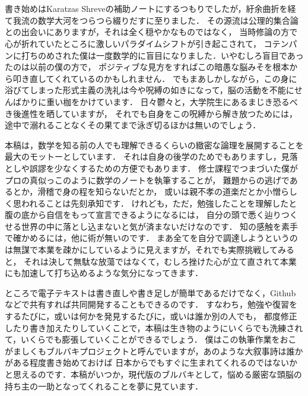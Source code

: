 \chapter*{}
書き始めはKaratzas Shreveの補助ノートにするつもりでしたが，紆余曲折を経て我流の数学大河をつらつら綴りだすに至りました．
その源流は公理的集合論との出会いにありますが，それは全く穏やかなものではなく，
当時修論の方で心が折れていたところに激しいパラダイムシフトが引き起こされて，
コテンパンに打ちのめされた僕は一度数学的に盲目になりました．いやむしろ盲目であったのは以前の僕の方で，
ポジティブな見方をすればこの暗愚な脳みそを根本から叩き直してくれているのかもしれません．
でもまあしかしながら，この身に浴びてしまった形式主義の洗礼は今や呪縛の如きになって，脳の活動を不能にせんばかりに重い枷をかけています．
日々鬱々と，大学院生にあるまじき恐るべき後進性を晒していますが，
それでも自身をこの呪縛から解き放つためには，途中で溺れることなくその果てまで泳ぎ切るほかは無いのでしょう．

本稿は，数学を知る前の人でも理解できるくらいの緻密な論理を展開することを最大のモットーとしています．
それは自身の後学のためでもありますし，見落としや誤謬を少なくするための方便でもあります．
修士課程でつまづいた僕がプロの真似っこのように数学のノートを執筆することが，
難題からの逃げであるとか，滑稽で身の程を知らないだとか，
或いは親不孝の道楽だとか小憎らしく思われることは先刻承知です．
けれども，ただ，勉強したことを理解したと腹の底から自信をもって宣言できるようになるには，
自分の頭で悉く辿りつくせる世界の中に落とし込まないと気が済まないだけなのです．
知の感触を素手で確かめるには，他に術が無いのです．
まあ全てを自分で調達しようというのは無謀で本業を疎かにしているように見えますが，それでも実際挑戦してみると，
それは決して無駄な放蕩ではなくて，むしろ挫けた心が立て直されて本業にも加速して打ち込めるような気分になってきます．

ところで電子テキストは書き直しや書き足しが簡単であるだけでなく，Githubなどで共有すれば共同開発することもできるのです．
すなわち，勉強や復習をするたびに，或いは何かを発見するたびに，或いは誰か別の人でも，
都度修正したり書き加えたりしていくことで，本稿は生き物のようにいくらでも洗練されて，いくらでも膨張していくことができるでしょう．
僕はこの執筆作業をおこがましくもブルバキプロジェクトと呼んでいますが，あのような大叙事詩は誰かがある程度書き始めておけば
日本からでもすぐに生まれてくれるのではないかと思えるのです．本稿がいつか，現代版のブルバキとして，悩める厳密な頭脳の持ち主の一助となってくれることを夢に見ています．

